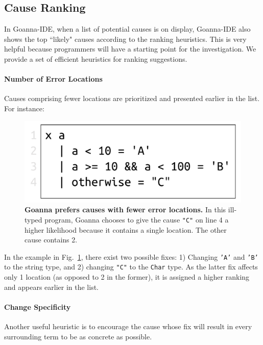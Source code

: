 \documentclass[pdflatex,sn-mathphys-num]{sn-jnl}%
\begin{document}
    \subsection{Cause Ranking} \label{sub:ranking}
     In Goanna-IDE, when a list of potential causes is on display, Goanna-IDE also shows the top ``likely" causes according to the ranking heuristics. This is very helpful because programmers will have a starting point for the investigation. We provide a set of efficient heuristics for ranking suggestions. 

    \paragraph{Number of Error Locations}
    Causes comprising fewer locations are prioritized and presented earlier in the list. For instance:
   \begin{figure}[ht!]
        \centering
        \includegraphics[width=0.5\linewidth]{images/Loc-Count}
        \caption[Goanna prefers causes with fewer error locations]{\textbf{Goanna prefers causes with fewer error locations.} In this ill-typed program, Goanna chooses to give the cause \texttt{"C"} on line 4 a higher likelihood because it contains a single location. The other cause contains 2. }
        \label{fig:loc-count}
    \end{figure}

    In the example in Fig.~\ref{fig:loc-count}, there exist two possible fixes: 1) Changing \texttt{'A'} and \texttt{'B'} to the string type, and 2) changing \texttt{"C"} to the \texttt{Char} type. As the latter fix affects only 1 location (as opposed to 2 in the former), it is assigned a higher ranking and appears earlier in the list.

    \paragraph{Change Specificity}
	Another useful heuristic is to encourage the cause whose fix will result in every surrounding term to be as concrete as possible.
	
\end{document}
